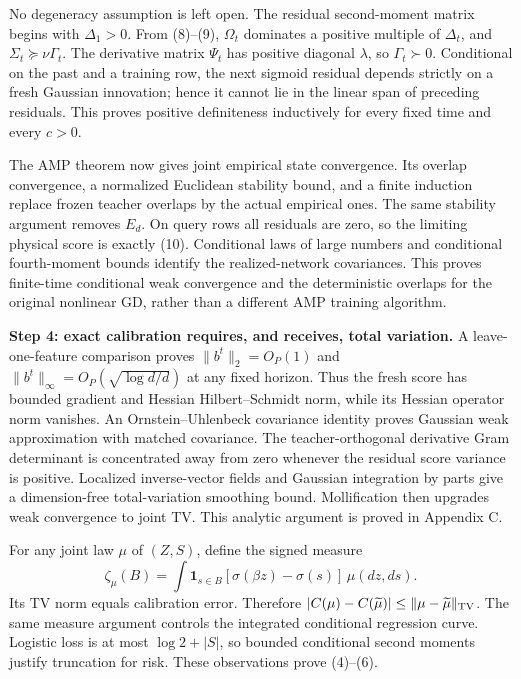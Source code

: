 \documentclass[
  11pt,
  a4paper,
]{article}
\begin{document}
No degeneracy assumption is left open. The residual second-moment matrix
begins with \(\Delta_1>0\). From (8)--(9), \(\Omega_t\) dominates a
positive multiple of \(\Delta_t\), and \(\Sigma_t\succeq\nu\Gamma_t\).
The derivative matrix \(\Psi_t\) has positive diagonal \(\lambda\), so
\(\Gamma_t\succ0\). Conditional on the past and a training row, the next
sigmoid residual depends strictly on a fresh Gaussian innovation; hence
it cannot lie in the linear span of preceding residuals. This proves
positive definiteness inductively for every fixed time and every
\(c>0\).

The AMP theorem now gives joint empirical state convergence. Its overlap
convergence, a normalized Euclidean stability bound, and a finite
induction replace frozen teacher overlaps by the actual empirical ones.
The same stability argument removes \(E_d\). On query rows all residuals
are zero, so the limiting physical score is exactly (10). Conditional
laws of large numbers and conditional fourth-moment bounds identify the
realized-network covariances. This proves finite-time conditional weak
convergence and the deterministic overlaps for the original nonlinear
GD, rather than a different AMP training algorithm.

\textbf{Step 4: exact calibration requires, and receives, total
variation.} A leave-one-feature comparison proves \(\|b^t\|_2=O_P(1)\)
and \(\|b^t\|_\infty=O_P(\sqrt{\log d/d})\) at any fixed horizon. Thus
the fresh score has bounded gradient and Hessian Hilbert--Schmidt norm,
while its Hessian operator norm vanishes. An Ornstein--Uhlenbeck
covariance identity proves Gaussian weak approximation with matched
covariance. The teacher-orthogonal derivative Gram determinant is
concentrated away from zero whenever the residual score variance is
positive. Localized inverse-vector fields and Gaussian integration by
parts give a dimension-free total-variation smoothing bound.
Mollification then upgrades weak convergence to joint TV. This analytic
argument is proved in Appendix C.

For any joint law \(\mu\) of \((Z,S)\), define the signed measure \[
\zeta_\mu(B)=\int\mathbf1_{s\in B}[\sigma(\beta z)-\sigma(s)]\,\mu(dz,ds).
\] Its TV norm equals calibration error. Therefore
\(|C(\mu)-C(\widetilde\mu)|\le\|\mu-\widetilde\mu\|_{\rm TV}\). The same
measure argument controls the integrated conditional regression curve.
Logistic loss is at most \(\log2+|S|\), so bounded conditional second
moments justify truncation for risk. These observations prove (4)--(6).
\end{document}
